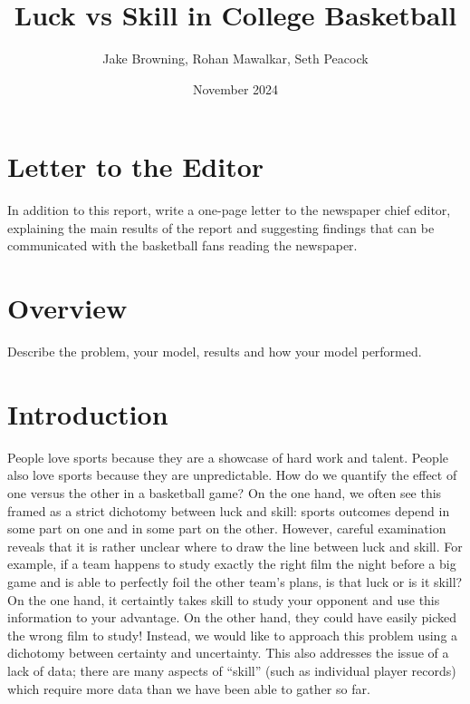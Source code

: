 \documentclass{article}
\title{Luck vs Skill in College Basketball}
\author{Jake Browning, Rohan Mawalkar, Seth Peacock}
\date{November 2024}
\begin{document}
\maketitle

\newpage

\section{Letter to the Editor}
In addition to this report, write a one-page letter to the newspaper chief editor, explaining the main results of
the report and suggesting findings that can be communicated with the basketball fans reading the newspaper.

\newpage

\section{Overview}
Describe the problem, your model, results and how your model performed.

\newpage

\section{Introduction}

People love sports because they are a showcase of hard work and talent. People also love sports because they are unpredictable. How do we quantify the effect of one versus the other in a basketball game? On the one hand, we often see this framed as a strict dichotomy between luck and skill: sports outcomes depend in some part on one and in some part on the other. However, careful examination reveals that it is rather unclear where to draw the line between luck and skill. For example, if a team happens to study exactly the right film the night before a big game and is able to perfectly foil the other team's plans, is that luck or is it skill? On the one hand, it certaintly takes skill to study your opponent and use this information to your advantage. On the other hand, they could have easily picked the wrong film to study! Instead, we would like to approach this problem using a dichotomy between certainty and uncertainty.  This also addresses the issue of a lack of data; there are many aspects of ``skill'' (such as individual player records) which require more data than we have been able to gather so far.
\end{document}
